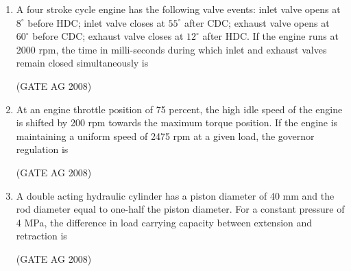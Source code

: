 \documentclass[journal,12pt,onecolumn]{IEEEtran}
\begin{document}
\begin{enumerate}
\medskip

\item 
 A four stroke cycle engine has the following valve events: inlet valve opens at $8^\circ$ before HDC; inlet valve closes at $55^\circ$ after CDC; exhaust valve opens at $60^\circ$ before CDC; exhaust valve closes at $12^\circ$ after HDC. If the engine runs at 2000 rpm, the time in milli-seconds during which inlet and exhaust valves remain closed simultaneously is
\begin{enumerate}
\end{enumerate}
\hfill(GATE AG 2008)\\

\medskip

\item 
 At an engine throttle position of 75 percent, the high idle speed of the engine is shifted by 200 rpm towards the maximum torque position. If the engine is maintaining a uniform speed of 2475 rpm at a given load, the governor regulation is
\begin{enumerate}
\end{enumerate}
\hfill(GATE AG 2008)\\

\medskip

\item 
 A double acting hydraulic cylinder has a piston diameter of 40 mm and the rod diameter equal to one-half the piston diameter. For a constant pressure of 4 MPa, the difference in load carrying capacity between extension and retraction is
\begin{enumerate}
\end{enumerate}
\hfill(GATE AG 2008)\\


\end{enumerate}
\end{document}
